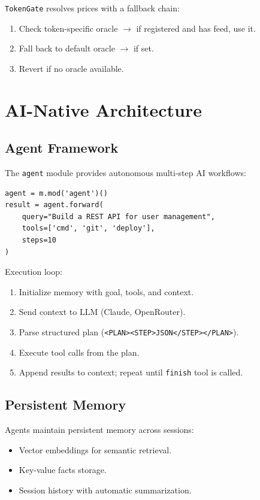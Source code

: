 \documentclass[11pt,a4paper]{article}
\begin{document}
\texttt{TokenGate} resolves prices with a fallback chain:
\begin{enumerate}
    \item Check token-specific oracle $\to$ if registered and has feed, use it.
    \item Fall back to default oracle $\to$ if set.
    \item Revert if no oracle available.
\end{enumerate}

\section{AI-Native Architecture}
\label{sec:ai}

\subsection{Agent Framework}

The \texttt{agent} module provides autonomous multi-step AI workflows:

\begin{lstlisting}[style=python]
agent = m.mod('agent')()
result = agent.forward(
    query="Build a REST API for user management",
    tools=['cmd', 'git', 'deploy'],
    steps=10
)
\end{lstlisting}

Execution loop:
\begin{enumerate}
    \item Initialize memory with goal, tools, and context.
    \item Send context to LLM (Claude, OpenRouter).
    \item Parse structured plan (\texttt{<PLAN><STEP>JSON</STEP></PLAN>}).
    \item Execute tool calls from the plan.
    \item Append results to context; repeat until \texttt{finish} tool is called.
\end{enumerate}

\subsection{Persistent Memory}

Agents maintain persistent memory across sessions:
\begin{itemize}
    \item Vector embeddings for semantic retrieval.
    \item Key-value facts storage.
    \item Session history with automatic summarization.
\end{itemize}
\end{document}
